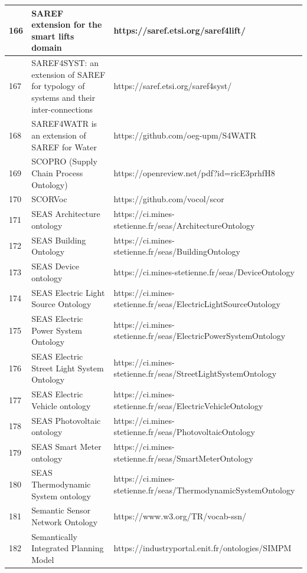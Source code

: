 \documentclass{article}
\begin{document}
\begin{table}[H]
{\begin{tabular}{|l|l|l|}
            166 & SAREF extension for the smart lifts domain & https://saref.etsi.org/saref4lift/ \\ \hline
            167 & SAREF4SYST: an extension of SAREF for typology of systems and their inter-connections & https://saref.etsi.org/saref4syst/ \\ \hline
            168 & SAREF4WATR is an extension of SAREF for Water & https://github.com/oeg-upm/S4WATR \\ \hline
            169 & SCOPRO (Supply Chain Process Ontology) & https://openreview.net/pdf?id=ricE3prhfH8 \\ \hline
            170 & SCORVoc & https://github.com/vocol/scor \\ \hline
            171 & SEAS Architecture ontology & https://ci.mines-stetienne.fr/seas/ArchitectureOntology \\ \hline
            172 & SEAS Building Ontology & https://ci.mines-stetienne.fr/seas/BuildingOntology \\ \hline
            173 & SEAS Device ontology & https://ci.mines-stetienne.fr/seas/DeviceOntology \\ \hline
            174 & SEAS Electric Light Source Ontology & https://ci.mines-stetienne.fr/seas/ElectricLightSourceOntology \\ \hline
            175 & SEAS Electric Power System Ontology & https://ci.mines-stetienne.fr/seas/ElectricPowerSystemOntology \\ \hline
            176 & SEAS Electric Street Light System Ontology & https://ci.mines-stetienne.fr/seas/StreetLightSystemOntology \\ \hline
            177 & SEAS Electric Vehicle ontology & https://ci.mines-stetienne.fr/seas/ElectricVehicleOntology \\ \hline
            178 & SEAS Photovoltaic ontology & https://ci.mines-stetienne.fr/seas/PhotovoltaicOntology \\ \hline
            179 & SEAS Smart Meter ontology & https://ci.mines-stetienne.fr/seas/SmartMeterOntology \\ \hline
            180 & SEAS Thermodynamic System ontology & https://ci.mines-stetienne.fr/seas/ThermodynamicSystemOntology \\ \hline
            181 & Semantic Sensor Network Ontology & https://www.w3.org/TR/vocab-ssn/ \\ \hline
            182 & Semantically Integrated Planning Model & https://industryportal.enit.fr/ontologies/SIMPM \\ \hline

\end{tabular}}
\end{table}
\end{document}
